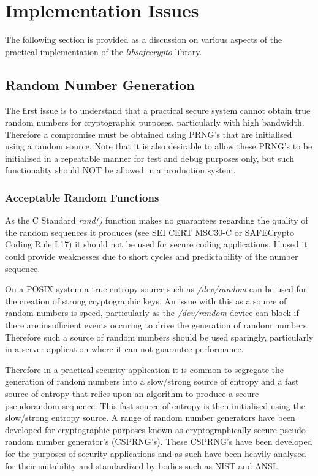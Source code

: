 \chapter{Implementation Issues}

The following section is provided as a discussion on various aspects of the practical implementation of the \textit{libsafecrypto} library.

\section{Random Number Generation}

The first issue is to understand that a practical secure system cannot obtain true random numbers for cryptographic purposes, particularly with high bandwidth. Therefore a compromise must be obtained using PRNG's that are initialised using a random source. Note that it is also desirable to allow these PRNG's to be initialised in a repeatable manner for test and debug purposes only, but such functionality should NOT be allowed in a production system.

\subsection{Acceptable Random Functions}

As the C Standard \textit{rand()} function makes no guarantees regarding the quality of the random sequences it produces (see SEI CERT MSC30-C or SAFECrypto Coding Rule I.17) it should not be used for secure coding applications. If used it could provide weaknesses due to short cycles and predictability of the number sequence.

On a POSIX system a true entropy source such as \textit{/dev/random} can be used for the creation of strong cryptographic keys. An issue with this as a source of random numbers is speed, particularly as the \textit{/dev/random} device can block if there are insufficient events occuring to drive the generation of random numbers. Therefore such a source of random numbers should be used sparingly, particularly in a server application where it can not guarantee performance.

Therefore in a practical security application it is common to segregate the generation of random numbers into a slow/strong source of entropy and a fast source of entropy that relies upon an algorithm to produce a secure pseudorandom sequence. This fast source of entropy is then initialised using the slow/strong entropy source. A range of random number generators have been developed for cryptographic purposes known as cryptographically secure pseudo random number generator's (CSPRNG's). These CSPRNG's have been developed for the purposes of security applications and as such have been heavily analysed for their suitability and standardized by bodies such as NIST and ANSI.

